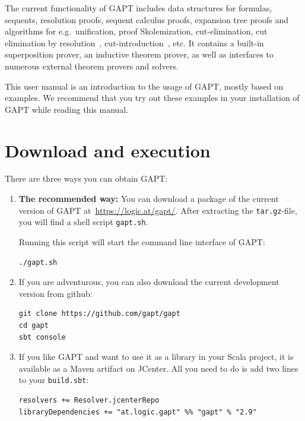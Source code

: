 \documentclass[a4paper,11pt]{book}
\begin{document}
The current functionality of GAPT includes data structures for formulas,
sequents, resolution proofs, sequent calculus proofs, expansion tree proofs and
algorithms for e.g.\ unification, proof Skolemization, cut-elimination, cut
elimination by resolution~\cite{Baaz00CutElimination},
cut-introduction~\cite{Hetzl2012}, etc. It contains a built-in superposition
prover, an inductive theorem prover, as well as interfaces to numerous external
theorem provers and solvers.

This user manual is an introduction to the usage of GAPT, mostly based on examples.
We recommend that you try out these examples in your installation of GAPT while
reading this manual.

\chapter{Download and execution}

There are three ways you can obtain GAPT:

\begin{enumerate}

\item {\bfseries The recommended way:}  You can download a package of the current
version of GAPT at~\url{https://logic.at/gapt/}.  After extracting
the \texttt{tar.gz}-file, you will find a shell script \texttt{gapt.sh}.

Running this script will start the command line interface of GAPT:
\begin{lstlisting}
./gapt.sh
\end{lstlisting}

\item If you are adventurous, you can also download the current development
  version from github:
\begin{lstlisting}
git clone https://github.com/gapt/gapt
cd gapt
sbt console
\end{lstlisting}

\item If you like GAPT and want to use it as a library in your Scala project,
  it is available as a Maven artifact on JCenter.  All you need to do is add
  two lines to your \verb,build.sbt,:
\begin{lstlisting}
resolvers += Resolver.jcenterRepo
libraryDependencies += "at.logic.gapt" %% "gapt" % "2.9"
\end{lstlisting}

\end{enumerate}
\end{document}
